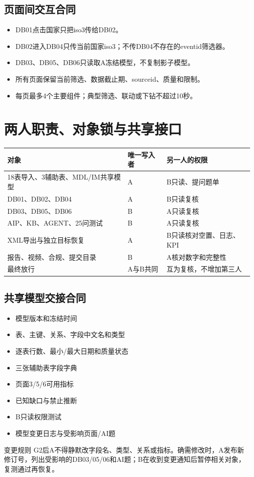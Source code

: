 \documentclass[UTF8,openany,zihao=-4]{ctexbook}
\renewcommand{\_}{\textunderscore\allowbreak}
\begin{document}
\section{页面间交互合同}
\begin{itemize}
\item DB01点击国家只把iso3传给DB02。
\item DB02进入DB04只传当前国家iso3；不传DB04不存在的event\_id筛选器。
\item DB03、DB05、DB06只读取A冻结模型，不复制影子模型。
\item 所有页面保留当前筛选、数据截止期、source\_id、质量和限制。
\item 每页最多4个主要组件；典型筛选、联动或下钻不超过10秒。
\end{itemize}
\chapter{两人职责、对象锁与共享接口}
\noindent\begin{tabularx}{\textwidth}{@{}p{}p{}X@{}}
\toprule
\textbf{对象} & \textbf{唯一写入者} & \textbf{另一人的权限} \\
\midrule
18表导入、3辅助表、MDL/IM共享模型 & A & B只读、提问题单 \\
DB01、DB02、DB04 & A & B只读复核 \\
DB03、DB05、DB06 & B & A只读复核 \\
AIP、KB、AGENT、25问测试 & B & A只读复核 \\
XML导出与独立目标恢复 & A & B只读核对空置、日志、KPI \\
报告、视频、合规、提交目录 & B & A核对数字和完整性 \\
最终放行 & A与B共同 & 互为复核，不增加第三人 \\
\bottomrule
\end{tabularx}
\section{共享模型交接合同}
\begin{itemize}[label=$\square$]
\item 模型版本和冻结时间
\item 表、主键、关系、字段中文名和类型
\item 逐表行数、最小/最大日期和质量状态
\item 三张辅助表字段字典
\item 页面3/5/6可用指标
\item 已知缺口与禁止推断
\item B只读权限测试
\item 模型变更日志与受影响页面/AI题
\end{itemize}
\begin{gatebox}{变更规则}
G2后A不得静默改字段名、类型、关系或指标。确需修改时，A发布新修订号，列出受影响的DB03/05/06和AI题；B在收到变更通知后暂停相关对象，复测通过再恢复。

\end{gatebox}
\end{document}
